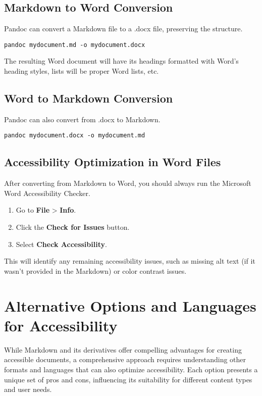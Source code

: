 \subsection{Markdown to Word Conversion}
\label{subsec:markdown-to-word}
Pandoc can convert a Markdown file to a .docx file, preserving the structure.
\begin{verbatim}
pandoc mydocument.md -o mydocument.docx
\end{verbatim}
The resulting Word document will have its headings formatted with Word's heading styles, lists will be proper Word lists, etc.

\subsection{Word to Markdown Conversion}
\label{subsec:word-to-markdown}
Pandoc can also convert from .docx to Markdown.
\begin{verbatim}
pandoc mydocument.docx -o mydocument.md
\end{verbatim}

\subsection{Accessibility Optimization in Word Files}
\label{subsec:word-accessibility-optimization}
After converting from Markdown to Word, you should always run the Microsoft Word Accessibility Checker.
\begin{enumerate}
	\item Go to \textbf{File} > \textbf{Info}.
	\item Click the \textbf{Check for Issues} button.
	\item Select \textbf{Check Accessibility}.
\end{enumerate}
This will identify any remaining accessibility issues, such as missing alt text (if it wasn't provided in the Markdown) or color contrast issues.

\section{Alternative Options and Languages for Accessibility}
\label{sec:alt-options-accessibility}

While Markdown and its derivatives offer compelling advantages for creating accessible documents, a comprehensive approach requires understanding other formats and languages that can also optimize accessibility. Each option presents a unique set of pros and cons, influencing its suitability for different content types and user needs.

